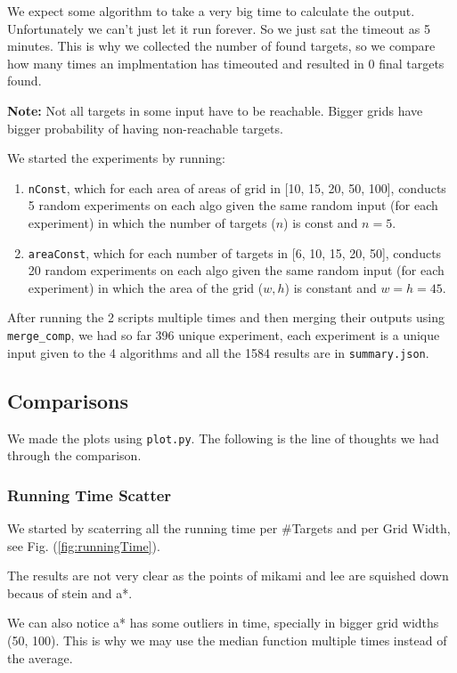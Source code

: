 We expect some algorithm to take a very big time to calculate the output. Unfortunately we can't just let it run forever. So we just sat the timeout as 5 minutes. This is why we collected the number of found targets, so we compare how many times an implmentation has timeouted and resulted in 0 final targets found.

\textbf{Note:} Not all targets in some input have to be reachable. Bigger grids have bigger probability of having non-reachable targets.

We started the experiments by running:
\begin{enumerate}
    \item \texttt{nConst}, which for each area of areas of grid in [10, 15, 20, 50, 100], conducts 5 random experiments on each algo given the same random input (for each experiment) in which the number of targets ($n$) is const and $n = 5$.
    \item \texttt{areaConst}, which for each number of targets in [6, 10, 15, 20, 50], conducts 20 random experiments on each algo given the same random input (for each experiment) in which the area of the grid ($w,h$) is constant and $w = h = 45$.
\end{enumerate}

After running the 2 scripts multiple times and then merging their outputs using \texttt{merge\_comp}, we had so far 396 unique experiment, each experiment is a unique input given to the 4 algorithms and all the 1584 results are in \texttt{summary.json}.

\subsection{Comparisons}
We made the plots using \texttt{plot.py}. The following is the line of thoughts we had through the comparison.

\subsubsection{Running Time Scatter}
We started by scaterring all the running time per \#Targets and per Grid Width, see Fig. (\ref{fig:runningTime}). 

The results are not very clear as the points of mikami and lee are squished down becaus of stein and a*. 

We can also notice a* has some outliers in time, specially in bigger grid widths (50, 100). This is why we may use the median function multiple times instead of the average.

